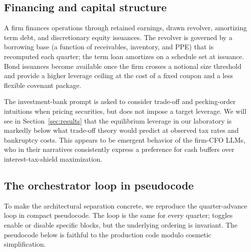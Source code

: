 \documentclass[11pt]{article}
\begin{document}
\subsection{Financing and capital structure}

A firm finances operations through retained earnings, drawn revolver,
amortizing term debt, and discretionary equity issuances. The revolver
is governed by a borrowing base (a function of receivables, inventory,
and PPE) that is recomputed each quarter; the term loan amortizes on a
schedule set at issuance. Bond issuances become available once the firm
crosses a notional size threshold and provide a higher leverage ceiling
at the cost of a fixed coupon and a less flexible covenant package.

The investment-bank prompt is asked to consider trade-off and pecking-order
intuitions when pricing securities, but does not impose a target
leverage. We will see in Section~\ref{sec:results} that the equilibrium
leverage in our laboratory is markedly below what trade-off theory would
predict at observed tax rates and bankruptcy costs. This appears to be
emergent behavior of the firm-CFO LLMs, who in their narratives
consistently express a preference for cash buffers over interest-tax-shield
maximization.

\subsection{The orchestrator loop in pseudocode}\label{sec:loop}

To make the architectural separation concrete, we reproduce the
quarter-advance loop in compact pseudocode. The loop is the same for
every quarter; toggles enable or disable specific blocks, but the
underlying ordering is invariant. The pseudocode below is faithful to
the production code modulo cosmetic simplification.
\end{document}
